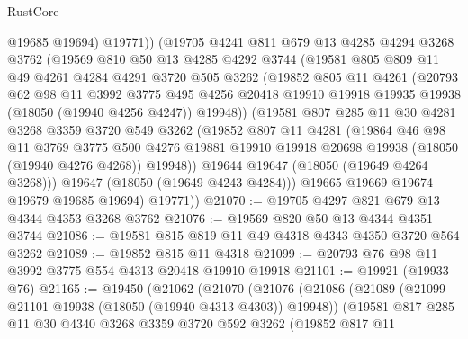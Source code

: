 \begin{lexlean}{RustCore}
\begin{coremodule}
            @19685
            @19694)
          @19771))
      (@19705
        @4241
        @811
        @679
        @13
        @4285
        @4294
        @3268
        @3762
        (@19569
          @810
          @50
          @13
          @4285
          @4292
          @3744
          (@19581
            @805
            @809
            @11
            @49
            @4261
            @4284
            @4291
            @3720
            @505
            @3262
            (@19852
              @805
              @11
              @4261
              (@20793
                @62
                @98
                @11
                @3992
                @3775
                @495
                @4256
                @20418
                @19910
                @19918
                @19935
                @19938
                (@18050 (@19940 @4256 @4247))
                @19948))
            (@19581
              @807
              @285
              @11
              @30
              @4281
              @3268
              @3359
              @3720
              @549
              @3262
              (@19852
                @807
                @11
                @4281
                (@19864
                  @46
                  @98
                  @11
                  @3769
                  @3775
                  @500
                  @4276
                  @19881
                  @19910
                  @19918
                  @20698
                  @19938
                  (@18050 (@19940 @4276 @4268))
                  @19948))
              @19644
              @19647
              (@18050 (@19649 @4264 @3268)))
            @19647
            (@18050 (@19649 @4243 @4284)))
          @19665
          @19669
          @19674
          @19679
          @19685
          @19694)
        @19771))
@21070 := @19705 @4297 @821 @679 @13 @4344 @4353 @3268 @3762
@21076 := @19569 @820 @50 @13 @4344 @4351 @3744
@21086 := @19581 @815 @819 @11 @49 @4318 @4343 @4350 @3720 @564 @3262
@21089 := @19852 @815 @11 @4318
@21099 := @20793 @76 @98 @11 @3992 @3775 @554 @4313 @20418 @19910 @19918
@21101 := @19921 (@19933 @76)
@21165 := @19450
    (@21062
      (@21070
        (@21076
          (@21086
            (@21089 (@21099 @21101 @19938 (@18050 (@19940 @4313 @4303)) @19948))
            (@19581
              @817
              @285
              @11
              @30
              @4340
              @3268
              @3359
              @3720
              @592
              @3262
              (@19852
                @817
                @11

\end{coremodule}
\end{lexlean}
